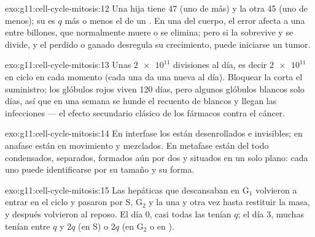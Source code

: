 \begin{solution}{exo:g11:cell-cycle-mitosis:12}
Una hija tiene 47  (uno de más) y la otra 45 (uno de menos);
su  es $q$ más o menos el de un . En una  del cuerpo,
el error afecta a una  entre billones, que normalmente muere o se
elimina; pero si la  sobrevive y se divide, y el 
perdido o ganado desregula su crecimiento, puede iniciarse un tumor.
\end{solution}

\begin{solution}{exo:g11:cell-cycle-mitosis:13}
Unas $\num{2e11}$ divisiones al día, es decir $\num{2e11}$  en
ciclo en cada momento (cada una da una  nueva al día). Bloquear
la  corta el suministro; los glóbulos rojos viven 120 días, pero
algunos glóbulos blancos solo días, así que en una semana se hunde el
recuento de blancos y llegan las infecciones --- el efecto secundario
clásico de los fármacos contra el cáncer.
\end{solution}

\begin{solution}{exo:g11:cell-cycle-mitosis:14}
En interfase los  están desenrollados e invisibles; en
anafase están en movimiento y mezclados. En metafase están del todo
condensados, separados, formados aún por dos  y situados en
un solo plano: cada uno puede identificarse por su tamaño y su forma.
\end{solution}

\begin{solution}{exo:g11:cell-cycle-mitosis:15}
Las  hepáticas que descansaban en $\mathrm{G_1}$ volvieron a
entrar en el ciclo y pasaron por S, $\mathrm{G_2}$ y la  una y
otra vez hasta restituir la masa, y después volvieron al reposo. El día
0, casi todas las  tenían $q$; el día 3, muchas tenían entre $q$
y $2q$ (en S) o $2q$ (en $\mathrm{G_2}$ o en ).
\end{solution}


